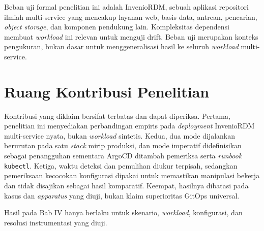 Beban uji formal penelitian ini adalah InvenioRDM, sebuah aplikasi repositori ilmiah multi-service yang mencakup layanan web, basis data, antrean, pencarian, \textit{object storage}, dan komponen pendukung lain. Kompleksitas dependensi membuat \textit{workload} ini relevan untuk menguji drift. Beban uji merupakan konteks pengukuran, bukan dasar untuk menggeneralisasi hasil ke seluruh \textit{workload} multi-service.

\section{Ruang Kontribusi Penelitian}

Kontribusi yang diklaim bersifat terbatas dan dapat diperiksa. Pertama, penelitian ini menyediakan perbandingan empiris pada \textit{deployment} InvenioRDM multi-service nyata, bukan \textit{workload} sintetis. Kedua, dua mode dijalankan berurutan pada satu \textit{stack} mirip produksi, dan mode imperatif didefinisikan sebagai penangguhan sementara ArgoCD ditambah pemeriksa serta \textit{runbook} \texttt{kubectl}. Ketiga, waktu deteksi dan pemulihan diukur terpisah, sedangkan pemeriksaan kecocokan konfigurasi dipakai untuk memastikan manipulasi bekerja dan tidak disajikan sebagai hasil komparatif. Keempat, hasilnya dibatasi pada kasus dan \textit{apparatus} yang diuji, bukan klaim superioritas GitOps universal.

Hasil pada Bab IV hanya berlaku untuk skenario, \textit{workload}, konfigurasi, dan resolusi instrumentasi yang diuji.

